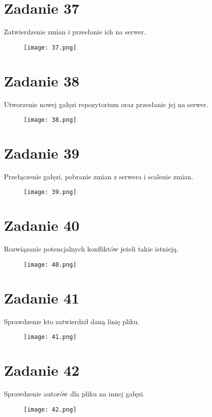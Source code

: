 \documentclass[fleqn,onecolumn,a4paper,12pt,titlepage]{article}
\begin{document}
\section*{Zadanie 37}
Zatwierdzenie zmian i przesłanie ich na serwer.
\begin{figure}[H]%
    \centering\texttt{[image: 37.png]}
\end{figure}

\section*{Zadanie 38}
Utworzenie nowej gałęzi repozytorium oraz przesłanie jej na serwer.
\begin{figure}[H]%
    \centering\texttt{[image: 38.png]}
\end{figure}

\section*{Zadanie 39}
Przełączenie gałęzi, pobranie zmian z serwera i scalenie zmian.
\begin{figure}[H]%
    \centering\texttt{[image: 39.png]}
\end{figure}

\section*{Zadanie 40}
Rozwiązanie potencjalnych konfliktów jeżeli takie istnieją.
\begin{figure}[H]%
    \centering\texttt{[image: 40.png]}
\end{figure}

\section*{Zadanie 41}
Sprawdzenie kto zatwierdził daną linię pliku.
\begin{figure}[H]%
    \centering\texttt{[image: 41.png]}
\end{figure}

\section*{Zadanie 42}
Sprawdzenie autorów dla pliku na innej gałęzi.
\begin{figure}[H]%
    \centering\texttt{[image: 42.png]}
\end{figure}
\end{document}
